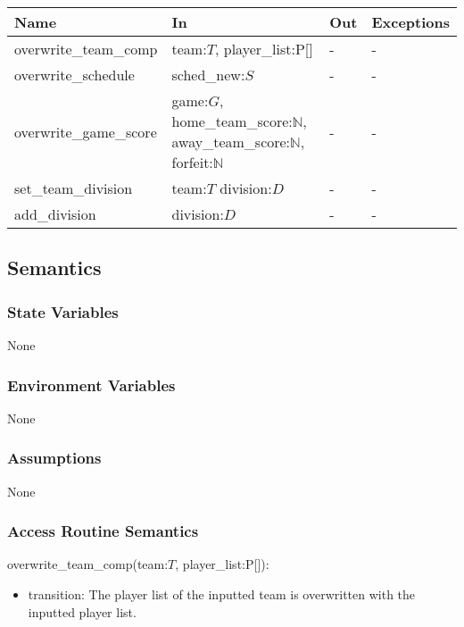 \documentclass[12pt, titlepage]{article}
\begin{document}
\begin{center}
\begin{tabular}{p{5cm} p{4cm} p{4cm} p{2cm}}
\hline
\textbf{Name} & \textbf{In} & \textbf{Out} & \textbf{Exceptions} \\
\hline
overwrite\_team\_comp & team:$T$, player\_list:P[] & - & - \\
overwrite\_schedule & sched\_new:$S$ & - & - \\
overwrite\_game\_score & game:$G$, home\_team\_score:$\mathbb{N}$, away\_team\_score:$\mathbb{N}$, forfeit:$\mathbb{N}$ & - & - \\
set\_team\_division & team:$T$ division:$D$ & - & - \\
add\_division & division:$D$ & - & - \\

\hline
\end{tabular}
\end{center}

\subsection{Semantics}

\subsubsection{State Variables}

None

\subsubsection{Environment Variables}

None

\subsubsection{Assumptions}


None

\subsubsection{Access Routine Semantics}

\noindent overwrite\_team\_comp(team:$T$, player\_list:P[]):
\begin{itemize}
\item transition: The player list of the inputted team is overwritten with the 
      inputted player list.
\end{itemize}
\end{document}
